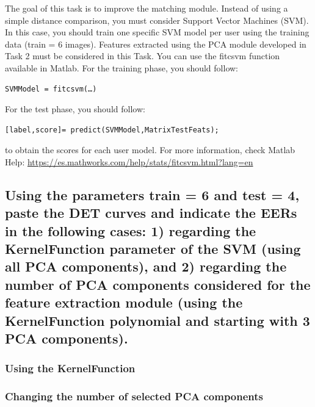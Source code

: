 \documentclass[a4paper]{article}
\begin{document}
The goal of this task is to improve the matching module. Instead of using a simple distance comparison, you must consider Support Vector Machines (SVM). In this case, you should train one specific SVM model per user using the training data (train = 6 images).
Features extracted using the PCA module developed in Task 2 must be considered in this Task. 
You can use the fitcsvm function available in Matlab. For the training phase, you should follow:
\begin{verbatim}
SVMModel = fitcsvm(…)
\end{verbatim}
For the test phase, you should follow:
\begin{verbatim}
[label,score]= predict(SVMModel,MatrixTestFeats);
\end{verbatim}
to obtain the scores for each user model. 
For more information, check Matlab Help:
\url{https://es.mathworks.com/help/stats/fitcsvm.html?lang=en} 
\subsection{ Using the parameters train = 6 and test = 4, paste the DET curves and indicate the EERs in the following cases: 1) regarding the KernelFunction parameter of the SVM (using all PCA components), and 2) regarding the number of PCA components considered for the feature extraction module (using the KernelFunction polynomial and starting with 3 PCA components).}

\subsubsection{Using the KernelFunction}

\subsubsection{Changing the number of selected PCA components}
\end{document}
